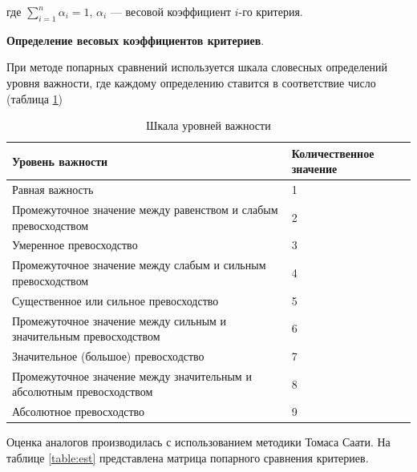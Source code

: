 	где $\sum\limits_{i=1}^{n}{\alpha_{i}} = 1$, $\alpha_{i}$ --- весовой коэффициент $i$-го критерия.

\par
	\textbf{Определение весовых коэффициентов критериев}.

	При методе попарных сравнений используется шкала словесных определений уровня важности, где каждому определению ставится в соответствие число (таблица \ref{table:scale})

	\begin{table}[h!]
		\begin{center}
			\caption{Шкала уровней важности}
			\begin{tabular}{ | p{} | p{} | }
				\hline
				Уровень важности & Количественное значение \\
				\hline
				Равная важность & 1 \\
				\hline
				Промежуточное значение между равенством и слабым превосходством & 2 \\
				\hline
				Умеренное превосходство & 3 \\
				\hline
				Промежуточное значение между слабым и сильным превосходством & 4 \\
				\hline
				Существенное или сильное превосходство & 5 \\
				\hline
				Промежуточное значение между сильным и значительным превосходством & 6 \\
				\hline
				Значительное (большое) превосходство & 7 \\
				\hline
				Промежуточное значение между значительным и абсолютным превосходством & 8 \\
				\hline
				Абсолютное превосходство & 9 \\
				\hline
			\end{tabular}
			\label{table:scale}
		\end{center}
	\end{table}

	\pagebreak

	Оценка аналогов производилась с использованием методики Томаса Саати. На таблице \ref{table:est} представлена матрица попарного сравнения критериев.

	\pagebreak

